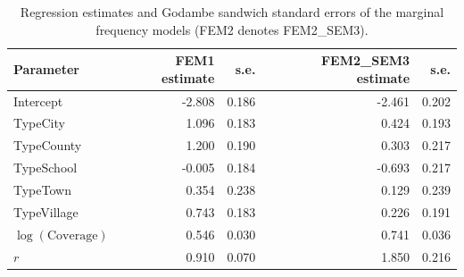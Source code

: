 \begin{table}[h!]
\centering
\begin{tabular}{lrrrr}
\toprule
Parameter & FEM1 estimate & s.e. & FEM2_SEM3 estimate & s.e. \\
\midrule
Intercept & -2.808 & 0.186 & -2.461 & 0.202 \\
TypeCity & 1.096 & 0.183 & 0.424 & 0.193 \\
TypeCounty & 1.200 & 0.190 & 0.303 & 0.217 \\
TypeSchool & -0.005 & 0.184 & -0.693 & 0.217 \\
TypeTown & 0.354 & 0.238 & 0.129 & 0.239 \\
TypeVillage & 0.743 & 0.183 & 0.226 & 0.191 \\
$\log(\mathrm{Coverage})$ & 0.546 & 0.030 & 0.741 & 0.036 \\
$r$ & 0.910 & 0.070 & 1.850 & 0.216 \\
\bottomrule
\end{tabular}
\caption{Regression estimates and Godambe sandwich standard errors of the marginal frequency models (FEM2 denotes FEM2_SEM3).}
\label{tab:MFreq_LGPIF}
\end{table}


